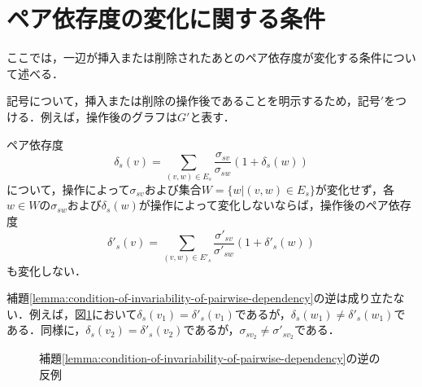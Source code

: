\section{ペア依存度の変化に関する条件}
ここでは，一辺が挿入または削除されたあとのペア依存度が変化する条件について述べる．

記号について，挿入または削除の操作後であることを明示するため，記号$'$をつける．例えば，操作後のグラフは$G'$と表す．

\begin{lemma-without-proof}
  \label{lemma:condition-of-invariability-of-pairwise-dependency}
  ペア依存度
  \begin{equation}
    \label{eq:pairwise-dependency}
    \delta_s(v)=\sum_{(v,w)\in E_s}\frac{\sigma_{sv}}{\sigma_{sw}}(1+\delta_s(w))
  \end{equation}
  について，操作によって$\sigma_{sv}$および集合$W=\{w|(v,w)\in E_s\}$が変化せず，各$w\in W$の$\sigma_{sw}$および$\delta_s(w)$が操作によって変化しないならば，操作後のペア依存度
 \begin{equation}
    \label{eq:pairwise-dependency-after-update}
    \delta'_s(v)=\sum_{(v,w)\in E'_s}\frac{\sigma'_{sv}}{\sigma'_{sw}}(1+\delta'_s(w))
  \end{equation}
 も変化しない．
\end{lemma-without-proof}

補題\ref{lemma:condition-of-invariability-of-pairwise-dependency}の逆は成り立たない．例えば，図\ref{fig:pd-invariability-counterexample}において$\delta_s(v_1)=\delta'_s(v_1)$であるが，$\delta_s(w_1)\neq\delta'_s(w_1)$である．同様に，$\delta_s(v_2)=\delta'_s(v_2)$であるが，$\sigma_{sv_2}\neq\sigma'_{sv_2}$である．

\begin{figure}[tb]
  \centering
  \def\svgwidth{.45\linewidth}
  
  \caption{補題\ref{lemma:condition-of-invariability-of-pairwise-dependency}の逆の反例}
  \label{fig:pd-invariability-counterexample}
\end{figure}

